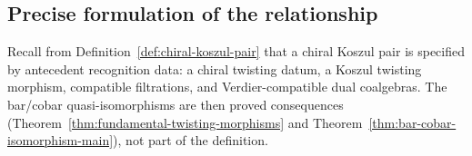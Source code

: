\subsection{Precise formulation of the relationship}

\begin{remark}\label{rem:koszul-criteria}
\label{rem:koszul-chiral}
Recall from Definition~\ref{def:chiral-koszul-pair} that a chiral Koszul pair
is specified by antecedent recognition data: a chiral twisting datum, a Koszul
twisting morphism, compatible filtrations, and Verdier-compatible dual coalgebras.
The bar/cobar quasi-isomorphisms are then proved consequences
(Theorem~\ref{thm:fundamental-twisting-morphisms} and
Theorem~\ref{thm:bar-cobar-isomorphism-main}), not part of the definition.
\end{remark}


